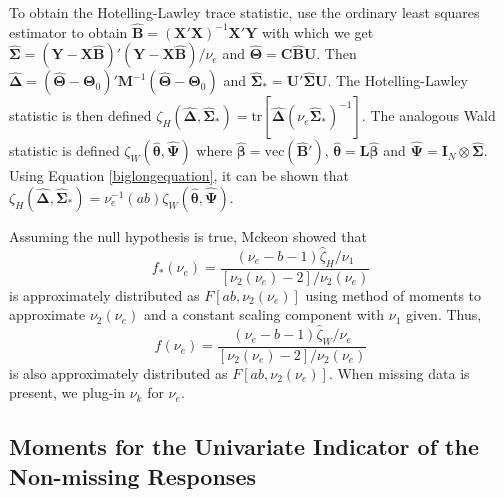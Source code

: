 \documentclass[11pt]{article}
\begin{document}
To obtain the Hotelling-Lawley trace statistic, use the ordinary least squares estimator to obtain $\hat{\boldsymbol{B}}=\left(\boldsymbol{X}'\boldsymbol{X}\right)^{-1}\boldsymbol{X}'\boldsymbol{Y}$ with which we get $\hat{\boldsymbol{\Sigma}}=\left(\boldsymbol{Y}-\boldsymbol{X}\hat{\boldsymbol{B}}\right)'\left(\boldsymbol{Y}-\boldsymbol{X}\hat{\boldsymbol{B}}\right)/\nu_{e}$ and $\hat{\boldsymbol{\Theta}}=\boldsymbol{C}\hat{\boldsymbol{B}}\boldsymbol{U}$. Then $\hat{\boldsymbol{\Delta}} = \left(\hat{\boldsymbol{\Theta}}-\boldsymbol{\Theta}_{0}\right)'\boldsymbol{M}^{-1}\left(\hat{\boldsymbol{\Theta}}-\boldsymbol{\Theta}_{0}\right)$ and $\hat{\boldsymbol{\Sigma}}_{\ast}=\boldsymbol{U}'\hat{\boldsymbol{\Sigma}}\boldsymbol{U}$. The Hotelling-Lawley statistic is then defined $\zeta_{H}(\hat{\boldsymbol{\Delta}}, \hat{\boldsymbol{\Sigma}}_{\ast}) = \text{tr}\left[\hat{\boldsymbol{\Delta}}\left(\nu_{e}\hat{\boldsymbol{\Sigma}}_{\ast}\right)^{-1}\right]$. The analogous Wald statistic is defined $\zeta_{W}\left(\hat{\boldsymbol{\theta}}, \hat{\boldsymbol{\Psi}}\right)$ where $\hat{\boldsymbol{\beta}}=\text{vec}\left(\hat{\boldsymbol{B}}'\right)$, $\hat{\boldsymbol{\theta}}=\boldsymbol{L}\hat{\boldsymbol{\beta}}$ and $\hat{\boldsymbol{\Psi}}=\boldsymbol{I}_{N}\otimes\hat{\boldsymbol{\Sigma}}$. Using Equation \ref{biglongequation}, it can be shown that $\zeta_{H}\left(\hat{\boldsymbol{\Delta}}, \hat{\boldsymbol{\Sigma}}_{\ast}\right)=\nu_e^{-1}\left(ab\right)\zeta_{W}(\hat{\boldsymbol{\theta}}, \hat{\boldsymbol{\Psi}}).$

Assuming the null hypothesis is true, Mckeon \cite{mckeon_f_1974} showed that 
\begin{equation}
f_{\ast}(\nu_{e}) = \frac{\left(\nu_{e}-b-1\right)\hat{\zeta}_{H}/\nu_{1}}{\left[\nu_{2}\left(\nu_{e}\right)-2\right]/\nu_{2}\left(\nu_{e}\right)}
\end{equation}
is approximately distributed as $F\left[ab,\nu_{2}\left(\nu_{e}\right)\right]$ using method of moments to approximate $\nu_{2}\left(\nu_{e}\right)$ and a constant scaling component with $\nu_{1}$ given. Thus,
\begin{equation}
f(\nu_{e}) = \frac{\left(\nu_{e}-b-1\right)\hat{\zeta}_{W}/\nu_{e}}{\left[\nu_{2}\left(\nu_{e}\right)-2\right]/\nu_{2}\left(\nu_{e}\right)}
\end{equation}
is also approximately distributed as $F\left[ab,\nu_{2}\left(\nu_{e}\right)\right]$. When missing data is present, we plug-in $\nu_{k}$ for $\nu_{e}$.

\subsection{Moments for the Univariate Indicator of the Non-missing Responses}
\label{missingdatasumind}
\end{document}
